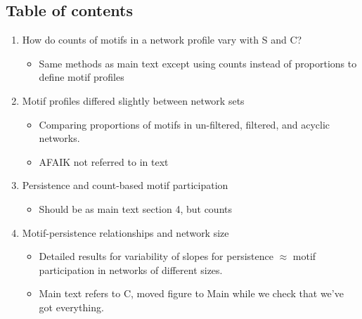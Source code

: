 \documentclass[12pt]{article}
\begin{document}
\setlength{\parindent}{15pt} 
\begin{spacing}{2.0}

\clearpage

\section*{Table of contents}
    \begin{spacing}{1.0}

    \begin{enumerate}
    
        \item How do counts of motifs in a network profile vary with S and C? \\
        
            \begin{itemize}
            \item Same methods as main text except using counts instead of proportions to define motif profiles
            \end{itemize}
            
            
        \item Motif profiles differed slightly between network sets

           \begin{itemize}
                \item Comparing proportions of motifs in un-filtered, filtered, and acyclic networks.
                \item AFAIK not referred to in text
            \end{itemize}    
            
        
         \item Persistence and count-based motif participation

           \begin{itemize}
                \item Should be as main text section 4, but counts
            \end{itemize}
                
        
        \item Motif-persistence relationships and network size
            \begin{itemize}
                \item Detailed results for variability of slopes for persistence $\approx$ motif participation in networks of different sizes.
                \item Main text refers to C, moved figure to Main while we check that we've got everything.
            \end{itemize}



\end{enumerate}
\end{spacing}
\end{spacing}
\end{document}
